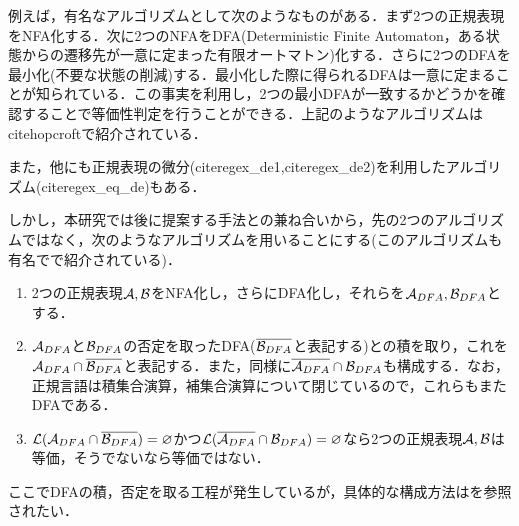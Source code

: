 \documentclass[a4paper, 12pt, dvipdfmx, uplatex]{jsreport}
\begin{document}
例えば，有名なアルゴリズムとして次のようなものがある．まず2つの正規表現をNFA化する．次に2つのNFAをDFA(Deterministic Finite Automaton，ある状態からの遷移先が一意に定まった有限オートマトン)化する．さらに2つのDFAを最小化(不要な状態の削減)する．最小化した際に得られるDFAは一意に定まることが知られている．この事実を利用し，2つの最小DFAが一致するかどうかを確認することで等価性判定を行うことができる．上記のようなアルゴリズムはcite{hopcroft}で紹介されている．

また，他にも正規表現の微分(cite{regex_de1},cite{regex_de2})を利用したアルゴリズム(cite{regex_eq_de})もある．

しかし，本研究では後に提案する手法との兼ね合いから，先の2つのアルゴリズムではなく，次のようなアルゴリズムを用いることにする(このアルゴリズムも有名で\cite{sipser}で紹介されている)．

\begin{enumerate}
  \item 2つの正規表現$\mathcal{A},\mathcal{B}$をNFA化し，さらにDFA化し，それらを$\mathcal{A}_{DFA},\mathcal{B}_{DFA}$とする．
  \item $\mathcal{A}_{DFA}$と$\mathcal{B}_{DFA}$の否定を取ったDFA($\overline{\mathcal{B}_{DFA}}$と表記する)との積を取り，これを$\mathcal{A}_{DFA}\cap\overline{\mathcal{B}_{DFA}}$と表記する．また，同様に$\overline{\mathcal{A}_{DFA}}\cap\mathcal{B}_{DFA}$も構成する．なお，正規言語は積集合演算，補集合演算について閉じているので，これらもまたDFAである．
  \item $\mathcal{L}(\mathcal{A}_{DFA}\cap\overline{\mathcal{B}_{DFA}})=\varnothing$かつ$\mathcal{L}(\overline{\mathcal{A}_{DFA}}\cap\mathcal{B}_{DFA})=\varnothing$なら2つの正規表現$\mathcal{A},\mathcal{B}$は等価，そうでないなら等価ではない．
\end{enumerate}

ここでDFAの積，否定を取る工程が発生しているが，具体的な構成方法は\cite{sipser}を参照されたい．













\end{document}
